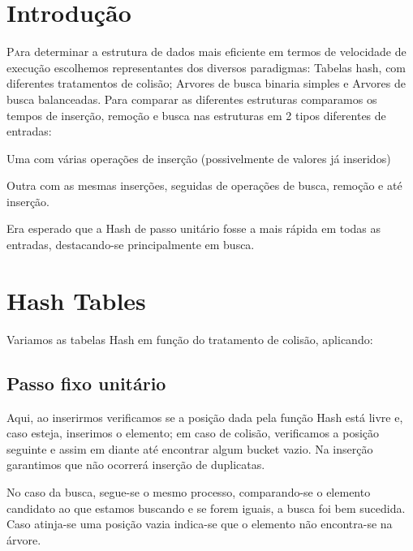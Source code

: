 \documentclass[twoside]{article}
\begin{document}
\begin{multicols}{2} %

\section{Introdução}

\lettrine[nindent=0em,lines=3]{P}ara determinar a estrutura de dados mais eficiente em termos de velocidade de execução escolhemos representantes dos diversos paradigmas:
Tabelas hash, com diferentes tratamentos de colisão; Arvores de busca binaria simples e Arvores de busca balanceadas.
Para comparar as diferentes estruturas comparamos os tempos de inserção, remoção e busca nas estruturas em 2 tipos diferentes de entradas:
\begin{compactitem}
\item Uma com várias operações de inserção (possivelmente de valores já inseridos)
\item Outra com as mesmas inserções, seguidas de operações de busca, remoção e até inserção. 
\end{compactitem}

Era esperado que a Hash de passo unitário fosse a mais rápida em todas as entradas, destacando-se principalmente em busca. 



\section{Hash Tables}


Variamos as tabelas Hash em função do tratamento de colisão, aplicando:

\subsection{ Passo fixo unitário }
\indent Aqui, ao inserirmos verificamos se a posição dada pela função Hash está livre e, caso esteja, inserimos o elemento; em caso de colisão, verificamos a posição seguinte e assim em diante até encontrar algum bucket vazio. Na inserção garantimos que não ocorrerá inserção de duplicatas.

\indent No caso da busca, segue-se o mesmo processo, comparando-se o elemento candidato ao que estamos buscando e se forem iguais, a busca foi bem sucedida. Caso atinja-se uma posição vazia indica-se que o elemento não encontra-se na árvore.


\end{multicols}
\end{document}
